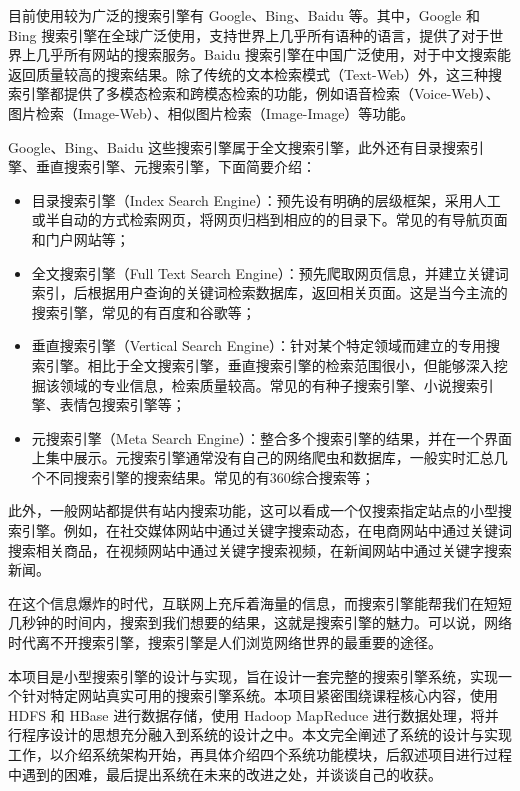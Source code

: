 \documentclass{ctexart}
\begin{document}
    目前使用较为广泛的搜索引擎有 Google、Bing、Baidu 等。其中，Google 和 Bing 搜索引擎在全球广泛使用，支持世界上几乎所有语种的语言，提供了对于世界上几乎所有网站的搜索服务。Baidu 搜索引擎在中国广泛使用，对于中文搜索能返回质量较高的搜索结果。除了传统的文本检索模式（Text-Web）外，这三种搜索引擎都提供了多模态检索和跨模态检索的功能，例如语音检索（Voice-Web）、图片检索（Image-Web）、相似图片检索（Image-Image）等功能。

    Google、Bing、Baidu 这些搜索引擎属于全文搜索引擎，此外还有目录搜索引擎、垂直搜索引擎、元搜索引擎\cite{baike-search-engine}，下面简要介绍：

    \begin{itemize}
        \item 目录搜索引擎（Index Search Engine）：预先设有明确的层级框架，采用人工或半自动的方式检索网页，将网页归档到相应的的目录下。常见的有导航页面和门户网站等；
        \item 全文搜索引擎（Full Text Search Engine）：预先爬取网页信息，并建立关键词索引，后根据用户查询的关键词检索数据库，返回相关页面。这是当今主流的搜索引擎，常见的有百度和谷歌等；
        \item 垂直搜索引擎（Vertical Search Engine）：针对某个特定领域而建立的专用搜索引擎。相比于全文搜索引擎，垂直搜索引擎的检索范围很小，但能够深入挖掘该领域的专业信息，检索质量较高。常见的有种子搜索引擎、小说搜索引擎、表情包搜索引擎等；
        \item 元搜索引擎（Meta Search Engine）：整合多个搜索引擎的结果，并在一个界面上集中展示。元搜索引擎通常没有自己的网络爬虫和数据库，一般实时汇总几个不同搜索引擎的搜索结果。常见的有360综合搜索等；
    \end{itemize}

    此外，一般网站都提供有站内搜索功能，这可以看成一个仅搜索指定站点的小型搜索引擎。例如，在社交媒体网站中通过关键字搜索动态，在电商网站中通过关键词搜索相关商品，在视频网站中通过关键字搜索视频，在新闻网站中通过关键字搜索新闻。

    在这个信息爆炸的时代，互联网上充斥着海量的信息，而搜索引擎能帮我们在短短几秒钟的时间内，搜索到我们想要的结果，这就是搜索引擎的魅力。可以说，网络时代离不开搜索引擎，搜索引擎是人们浏览网络世界的最重要的途径。

    本项目是小型搜索引擎的设计与实现，旨在设计一套完整的搜索引擎系统，实现一个针对特定网站真实可用的搜索引擎系统。本项目紧密围绕课程核心内容，使用 HDFS 和 HBase 进行数据存储，使用 Hadoop MapReduce 进行数据处理，将并行程序设计的思想充分融入到系统的设计之中。本文完全阐述了系统的设计与实现工作，以介绍系统架构开始，再具体介绍四个系统功能模块，后叙述项目进行过程中遇到的困难，最后提出系统在未来的改进之处，并谈谈自己的收获。
\end{document}

